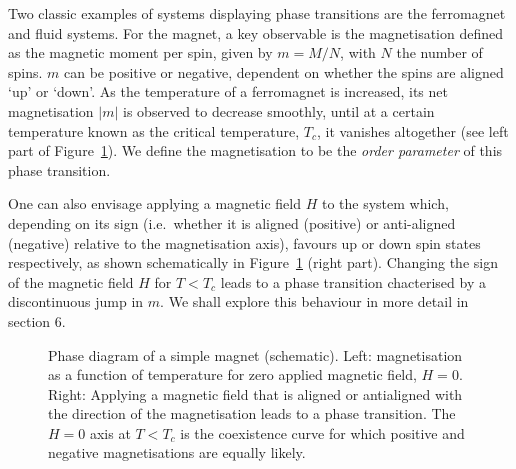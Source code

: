 \documentclass[
  letterpaper,
  enabledeprecatedfontcommands]{report}
\begin{document}
Two classic examples of systems displaying phase transitions are the
ferromagnet and fluid systems. For the magnet, a key observable is the
magnetisation defined as the magnetic moment per spin, given by
\(m=M/N\), with \(N\) the number of spins. \(m\) can be positive or
negative, dependent on whether the spins are aligned `up' or `down'. As
the temperature of a ferromagnet is increased, its net magnetisation
\(|m|\) is observed to decrease smoothly, until at a certain temperature
known as the critical temperature, \(T_c\), it vanishes altogether (see
left part of Figure~\ref{fig-isingpd}). We define the magnetisation to
be the \emph{order parameter} of this phase transition.

One can also envisage applying a magnetic field \(H\) to the system
which, depending on its sign (i.e.~whether it is aligned (positive) or
anti-aligned (negative) relative to the magnetisation axis), favours up
or down spin states respectively, as shown schematically in
Figure~\ref{fig-isingpd} (right part). Changing the sign of the magnetic
field \(H\) for \(T<T_c\) leads to a phase transition chacterised by a
discontinuous jump in \(m\). We shall explore this behaviour in more
detail in section 6.

\begin{figure}


\caption{\label{fig-isingpd}Phase diagram of a simple magnet
(schematic). Left: magnetisation as a function of temperature for zero
applied magnetic field, \(H=0\). Right: Applying a magnetic field that
is aligned or antialigned with the direction of the magnetisation leads
to a phase transition. The \(H=0\) axis at \(T<T_c\) is the coexistence
curve for which positive and negative magnetisations are equally
likely.}

\end{figure}%
\end{document}
